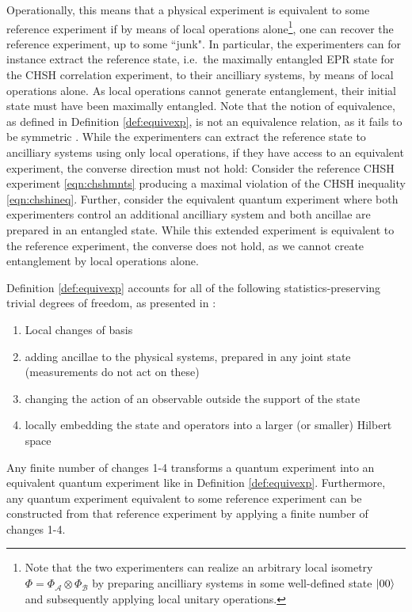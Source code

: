 Operationally, this means that a physical experiment is equivalent to some reference experiment if by means of local operations alone\footnote{Note that the two experimenters can realize an arbitrary local isometry $\Phi=\Phi_{\mathcal{A}}\otimes\Phi_{\mathcal{B}}$ by preparing ancilliary systems in some well-defined state $\ket{00}$ and subsequently applying local unitary operations.}, one can recover the reference experiment, up to some ``junk". In particular, the experimenters can for instance extract the reference state, i.e.\ the maximally entangled EPR state for the CHSH correlation experiment, to their ancilliary systems, by means of local operations alone. As local operations cannot generate entanglement, their initial state must have been maximally entangled. Note that the notion of equivalence, as defined in Definition \ref{def:equivexp}, is not an equivalence relation, as it fails to be symmetric \cite{McKague2011}.  While the experimenters can extract the reference state to ancilliary systems using only local operations, if they have access to an equivalent experiment, the converse direction must not hold: Consider the reference CHSH experiment \ref{eqn:chshmnts} producing a maximal violation of the CHSH inequality \ref{eqn:chshineq}. Further, consider the equivalent quantum experiment where both experimenters control an additional ancilliary system and both ancillae are prepared in an entangled state. While this extended experiment is equivalent to the reference experiment, the converse does not hold, as we cannot create entanglement by local operations alone.

Definition \ref{def:equivexp} accounts for all of the following statistics-preserving trivial degrees of freedom, as presented in \cite{McKague2011}:
\begin{enumerate}
    \item Local changes of basis
    \item adding ancillae to the physical systems, prepared in any joint state (measurements do not act on these)
    \item changing the action of an observable outside the support of the state
    \item locally embedding the state and operators into a larger (or smaller) Hilbert space
\end{enumerate}

\begin{claim}
Any finite number of changes 1-4 transforms a quantum experiment into an equivalent quantum experiment like in Definition \ref{def:equivexp}. Furthermore, any quantum experiment equivalent to some reference experiment can be constructed from that reference experiment by applying  a finite number of changes 1-4.
\end{claim}

